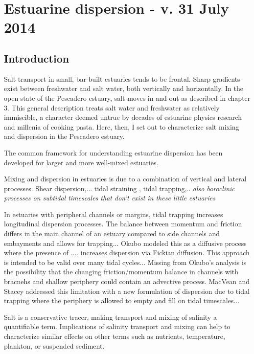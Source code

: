 \chapter{Estuarine dispersion - v. 31 July 2014}
\label{chSalt}


\section{Introduction}

Salt transport in small, bar-built estuaries tends to be frontal. Sharp gradients exist between freshwater and salt water, both vertically and horizontally. In the open state of the Pescadero estuary, salt moves in and out as described in chapter 3. This general description treats salt water and freshwater as relatively immiscible, a character deemed untrue by decades of estuarine physics research and millenia of cooking pasta. Here, then, I set out to characterize salt mixing and dispersion in the Pescadero estuary. 


The common framework for understanding estuarine dispersion has been developed for larger and more well-mixed estuaries. 


Mixing and dispersion in estuaries is due to a combination of vertical and lateral processes. Shear dispersion,... tidal straining \parencite{Simpson:1990aa}, tidal trapping,.. \emph{also baroclinic processes on subtidal timescales that don't exist in these little estuaries}



In estuaries with peripheral channels or margins, tidal trapping increases longitudinal dispersion processes. The balance between momentum and friction differs in the main channel of an estuary compared to side channels and embayments and allows for trapping...  Okubo \parencite*{okubo_effect_1973} modeled this as a diffusive process where the presence of .... increases dispersion via Fickian diffusion. This approach is intended to be valid over many tidal cycles... Missing from Okubo's analysis is the possibility that the changing friction/momentum balance in channels with bracnehs and shallow periphery could contain an advective process. MacVean and Stacey \parencite*{macvean_estuarine_2011} addressed this limitation with a new formulation of dispersion due to tidal trapping where the periphery is allowed to empty and fill on tidal timescales... 

Salt is a conservative tracer, making transport and mixing of salinity a quantifiable term. Implications of salinity transport and mixing can help to characterize similar effects on other terms such as nutrients, temperature, plankton, or suspended sediment. 

